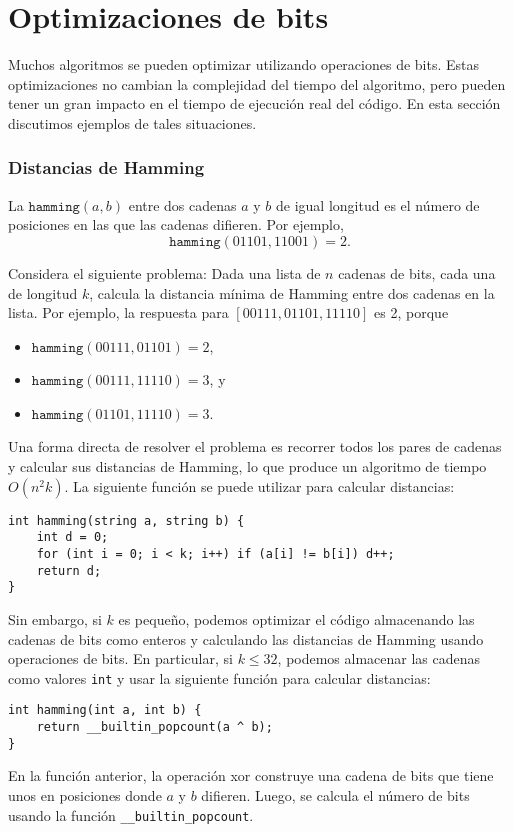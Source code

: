 \section{Optimizaciones de bits}

Muchos algoritmos se pueden optimizar utilizando
operaciones de bits.
Estas optimizaciones no cambian la
complejidad del tiempo del algoritmo,
pero pueden tener un gran impacto
en el tiempo de ejecución real del código.
En esta sección discutimos ejemplos
de tales situaciones.

\subsubsection{Distancias de Hamming}

La 
$\texttt{hamming}(a,b)$ entre dos
cadenas $a$ y $b$ de igual longitud es
el número de posiciones en las que las cadenas difieren.
Por ejemplo,
\[\texttt{hamming}(01101,11001)=2.\]

Considera el siguiente problema: Dada
una lista de $n$ cadenas de bits, cada una de longitud $k$,
calcula la distancia mínima de Hamming
entre dos cadenas en la lista.
Por ejemplo, la respuesta para $[00111,01101,11110]$
es 2, porque
\begin{itemize}[noitemsep]
    \item $\texttt{hamming}(00111,01101)=2$,
    \item $\texttt{hamming}(00111,11110)=3$, y
    \item $\texttt{hamming}(01101,11110)=3$.
\end{itemize}

Una forma directa de resolver el problema es
recorrer todos los pares de cadenas y calcular
sus distancias de Hamming,
lo que produce un algoritmo de tiempo $O(n^2 k)$.
La siguiente función se puede utilizar para
calcular distancias:
\begin{lstlisting}
int hamming(string a, string b) {
    int d = 0;
    for (int i = 0; i < k; i++) if (a[i] != b[i]) d++;
    return d;
}
\end{lstlisting}

Sin embargo, si $k$ es pequeño, podemos optimizar el código
almacenando las cadenas de bits como enteros y
calculando las distancias de Hamming usando operaciones de bits.
En particular, si $k \le 32$, podemos almacenar
las cadenas como valores \texttt{int} y usar la
siguiente función para calcular distancias:
\begin{lstlisting}
int hamming(int a, int b) {
    return __builtin_popcount(a ^ b);
}
\end{lstlisting}
En la función anterior, la operación xor construye
una cadena de bits que tiene unos en posiciones
donde $a$ y $b$ difieren.
Luego, se calcula el número de bits usando
la función \texttt{\_\_builtin\_popcount}.

